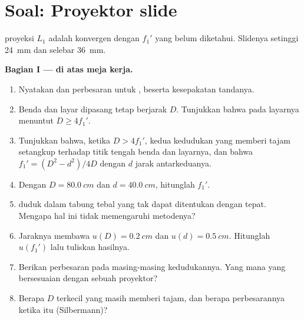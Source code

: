 \section{Soal: Proyektor slide}

\begin{problem}
\label{pb:b1:mirrors-thin-lenses:1}
 proyeksi $L_1$ adalah  konvergen dengan 
$f_1'$ yang belum diketahui. Slidenya setinggi \qty{24}{mm} dan selebar \qty{36}{mm}.

\medskip
\noindent\textbf{Bagian I ---  di atas meja kerja.}
\begin{enumerate}
  \item Nyatakan  dan perbesaran untuk ,
        beserta kesepakatan tandanya.
  \item Benda dan layar dipasang tetap berjarak $D$. Tunjukkan bahwa
         pada layarnya menuntut $D \geq 4f_1'$.
  \item Tunjukkan bahwa, ketika $D > 4f_1'$, kedua kedudukan  yang
        memberi  tajam setangkup terhadap titik tengah benda
        dan layarnya, dan bahwa $f_1' = (D^2 - d^2)/4D$ dengan $d$
        jarak antarkeduanya.
  \item Dengan $D = \qty{80.0}{cm}$ dan $d = \qty{40.0}{cm}$, hitunglah
        $f_1'$.
  \item {} duduk dalam tabung tebal yang  tak dapat
        ditentukan dengan tepat. Mengapa hal ini tidak memengaruhi
        metodenya?
  \item Jaraknya membawa $u(D) = \qty{0.2}{cm}$ dan
        $u(d) = \qty{0.5}{cm}$. Hitunglah $u(f_1')$ lalu tuliskan hasilnya.
  \item Berikan perbesaran pada masing-masing kedudukannya. Yang mana
        yang bersesuaian dengan sebuah proyektor?
  \item Berapa $D$ terkecil yang masih memberi  tajam, dan
        berapa perbesarannya ketika itu (Silbermann)?
\end{enumerate}


\end{problem}

